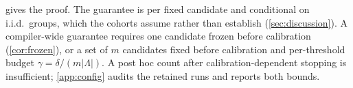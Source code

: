  gives the proof. The guarantee is per fixed candidate and
conditional on i.i.d.\ groups, which the cohorts assume rather than establish
(\cref{sec:discussion}). A compiler-wide guarantee requires one candidate frozen before calibration
(\cref{cor:frozen}), or a set of $m$ candidates fixed before calibration and
per-threshold budget $\gamma=\delta/(m|\Lambda|)$. A post hoc count after
calibration-dependent stopping is insufficient; \cref{app:config} audits the
retained runs and reports both bounds.
